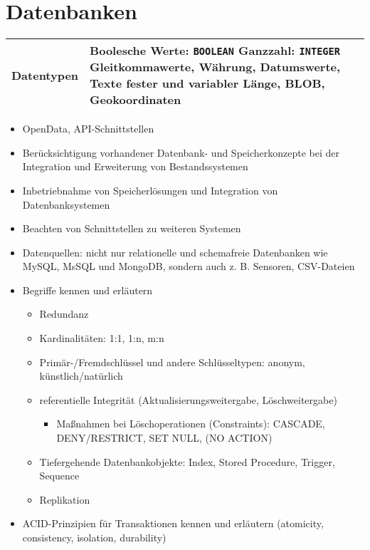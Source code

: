 \section{Datenbanken}
\label{sec:Datenbanken}

\begin{center}
	\begin{tabular}{|l | p{}|}
		\hline
		Datentypen & Boolesche Werte: \texttt{BOOLEAN} \newline Ganzzahl: \texttt{INTEGER} \newline Gleitkommawerte, Währung, Datumswerte, Texte fester und variabler Länge, BLOB, Geokoordinaten \\
		\hline
	\end{tabular}
\end{center}

\begin{itemize}[noitemsep]
	\item OpenData, API-Schnittstellen
	\item Berücksichtigung vorhandener Datenbank- und Speicherkonzepte bei der Integration und Erweiterung von Bestandssystemen
	\item Inbetriebnahme von Speicherlösungen und Integration von Datenbanksystemen
	\item Beachten von Schnittstellen zu weiteren Systemen
	\item Datenquellen: nicht nur relationelle und schemafreie Datenbanken wie MySQL, MsSQL und MongoDB, sondern auch z. B. Sensoren, CSV-Dateien
	\item Begriffe kennen und erläutern
	\begin{itemize}[noitemsep]
		\item Redundanz
		\item Kardinalitäten: 1:1, 1:n, m:n
		\item Primär-/Fremdschlüssel und andere Schlüsseltypen: anonym, künstlich/natürlich
		\item referentielle Integrität (Aktualisierungsweitergabe, Löschweitergabe)
		\begin{itemize}[noitemsep]
			\item Maßnahmen bei Löschoperationen (Constraints): CASCADE, DENY/RESTRICT, SET NULL, (NO ACTION)
		\end{itemize}
		\item Tiefergehende Datenbankobjekte: Index, Stored Procedure, Trigger, Sequence
		\item Replikation
	\end{itemize}
	\item ACID-Prinzipien für Transaktionen kennen und erläutern (atomicity, consistency, isolation, durability)
\end{itemize}






